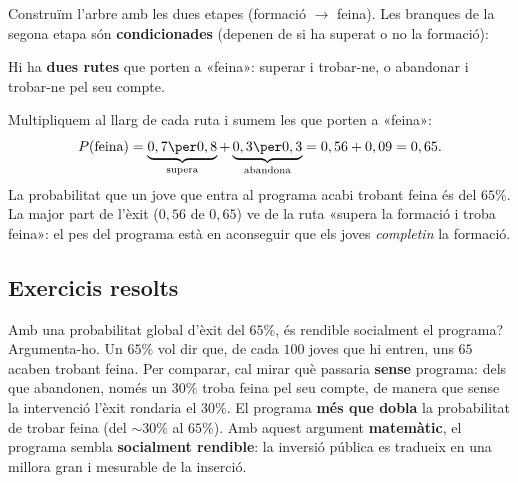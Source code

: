 \begin{exemple}
Construïm l'arbre amb les dues etapes (formació $\rightarrow$ feina). Les branques de la
segona etapa són \textbf{condicionades} (depenen de si ha superat o no la formació):

\begin{center}

\end{center}

\noindent Hi ha \textbf{dues rutes} que porten a «feina»: superar i trobar-ne, o
abandonar i trobar-ne pel seu compte.
\end{exemple}

\begin{exemple}
Multipliquem al llarg de cada ruta i sumem les que porten a «feina»:
\[
P(\text{feina})=\underbrace{0,7\per 0,8}_{\text{supera}}+\underbrace{0,3\per 0,3}_{\text{abandona}}
=0,56+0,09=0,65.
\]
La probabilitat que un jove que entra al programa acabi trobant feina és del
\textbf{$65\%$}. La major part de l'èxit ($0,56$ de $0,65$) ve de la ruta «supera la
formació i troba feina»: el pes del programa està en aconseguir que els joves
\emph{completin} la formació.
\end{exemple}

\subsection{Exercicis resolts}

\begin{exresolt}
Amb una probabilitat global d'èxit del $65\%$, és rendible socialment el programa?
Argumenta-ho.
\solucio
Un $65\%$ vol dir que, de cada $100$ joves que hi entren, uns $65$ acaben trobant
feina. Per comparar, cal mirar què passaria \textbf{sense} programa: dels que
abandonen, només un $30\%$ troba feina pel seu compte, de manera que sense la
intervenció l'èxit rondaria el $30\%$. El programa \textbf{més que dobla} la
probabilitat de trobar feina (del $\sim 30\%$ al $65\%$). Amb aquest argument
\textbf{matemàtic}, el programa sembla \textbf{socialment rendible}: la inversió pública
es tradueix en una millora gran i mesurable de la inserció.
\end{exresolt}

